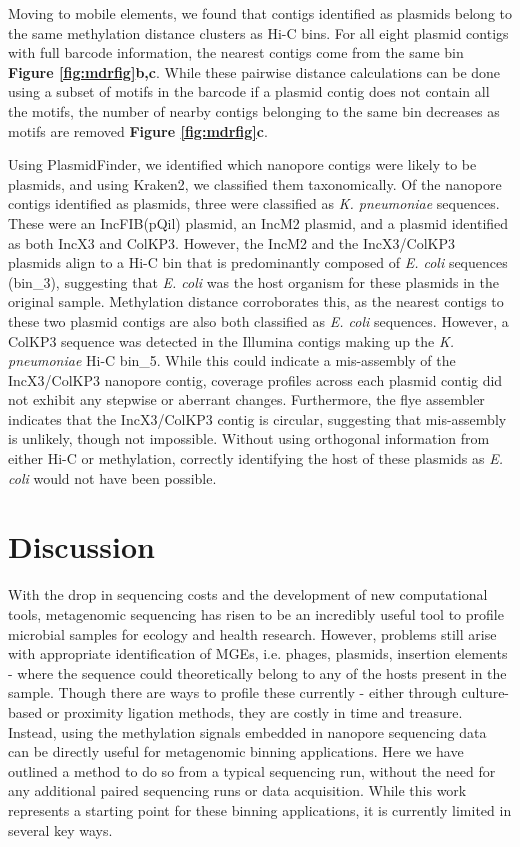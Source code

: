 Moving to mobile elements, we found that contigs identified as plasmids belong to the same methylation distance clusters as Hi-C bins.  For all eight plasmid contigs with full barcode information,  the nearest contigs come from the same bin {\bf Figure \ref{fig:mdrfig}b,c}. While these pairwise distance calculations can be done using a subset of motifs in the barcode if a plasmid contig does not contain all the motifs, the number of nearby contigs belonging to the same bin decreases as motifs are removed {\bf Figure \ref{fig:mdrfig}c}.

Using PlasmidFinder, we identified which nanopore contigs were likely to be plasmids, and using Kraken2, we classified them taxonomically. Of the nanopore contigs identified as plasmids, three were classified as \textit{K. pneumoniae} sequences. These were an IncFIB(pQil) plasmid, an IncM2 plasmid, and a plasmid identified as both IncX3 and ColKP3. However, the IncM2 and the IncX3/ColKP3 plasmids align to a Hi-C bin that is predominantly composed of \textit{E. coli} sequences (bin\_3), suggesting that \textit{E. coli} was the host organism for these plasmids in the original sample. Methylation distance corroborates this, as the nearest contigs to these two plasmid contigs are also both classified as \textit{E. coli} sequences. However, a ColKP3 sequence was detected in the Illumina contigs making up the \textit{K. pneumoniae} Hi-C bin\_5. While this could indicate a mis-assembly of the IncX3/ColKP3 nanopore contig, coverage profiles across each plasmid contig did not exhibit any stepwise or aberrant changes. Furthermore, the flye assembler indicates that the IncX3/ColKP3 contig is circular, suggesting that mis-assembly is unlikely, though not impossible. Without using orthogonal information from either Hi-C or methylation, correctly identifying the host of these plasmids as \textit{E. coli} would not have been possible.

\section{Discussion}
\label{sec:discuss}

With the drop in sequencing costs and the development of new computational tools, metagenomic sequencing has risen to be an incredibly useful tool to profile microbial samples for ecology and health research. However, problems still arise with appropriate identification of MGEs, i.e. phages, plasmids, insertion elements - where the sequence could theoretically belong to any of the hosts present in the sample. Though there are ways to profile these currently - either through culture-based or proximity ligation methods, they are costly in time and treasure. Instead, using the methylation signals embedded in nanopore sequencing data can be directly useful for metagenomic binning applications. Here we have outlined a method to do so from a typical sequencing run, without the need for any additional paired sequencing runs or data acquisition. While this work represents a starting point for these binning applications, it is currently limited in several key ways.

